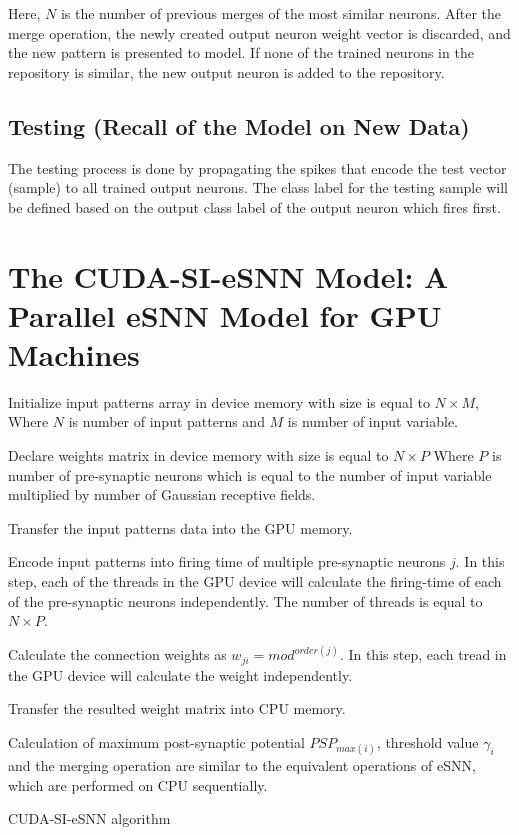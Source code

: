 Here, $N$ is the number of previous merges of the most similar neurons. After the merge operation, the newly created output neuron weight vector is discarded, and the new pattern is presented to model. If none of the trained neurons in the repository is similar, the new output neuron is added to the repository.


\subsection{Testing (Recall of the Model on New Data)}

The testing process is done by propagating the spikes that encode the test vector (sample) to all trained output neurons. The class label for the testing sample will be defined based on the output class label of the output neuron which fires first.


\section{The CUDA-SI-eSNN Model: A Parallel eSNN Model for GPU Machines}
\label{sec:cuda_esnn}

\begin{algorithm}
	\begin{algorithmic}[1]
		
		\STATE Initialize input patterns array in device memory with size is equal to $N \times M$, Where $N$ is number of input patterns and $M$ is number of input variable.
		
		\STATE Declare weights matrix in device memory with size is equal to $N \times P$
		Where $P$ is number of pre-synaptic neurons which is equal to the number of input variable multiplied by number of Gaussian receptive fields.
		
		\STATE Transfer the input patterns data into the GPU memory.
		
		\STATE Encode input patterns into firing time of multiple pre-synaptic neurons $j$. In this step, each of the threads in the GPU device will calculate the firing-time of each of the pre-synaptic neurons independently. The number of threads is equal to $N \times P$.
		
		\STATE Calculate the connection weights as  $w_{ji}=mod^{order(j)}$. In this step, each tread in the GPU device will calculate the weight independently.
		
		\STATE Transfer the resulted weight matrix into CPU memory.
		
		\STATE Calculation of maximum post-synaptic potential $PSP_{max⁡(i)}$, 	threshold value $\gamma_i$ and the 	merging operation are similar to the equivalent operations of eSNN, which are performed on CPU sequentially.
	\end{algorithmic}
	\caption{CUDA-SI-eSNN algorithm}
	\label{alg:cuda_esnn}
\end{algorithm}

